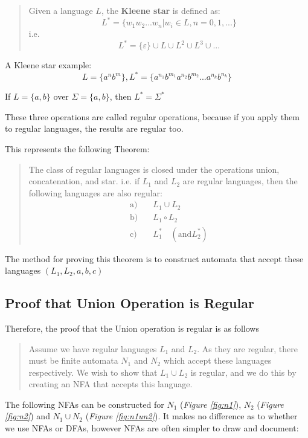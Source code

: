 \documentclass[11pt]{article}
\begin{document}
\begin{quote}
	Given a language $L$, the \textbf{Kleene star} is defined as:
	$$L^\ast=\{w_1w_2...w_n|w_i\in L, n = 0,1,...\}$$
	i.e.
	$$L^\ast=\{\varepsilon\} \cup L \cup L^2 \cup L^3 \cup ...$$
\end{quote}

A Kleene star example:
$$L = \{a^nb^m\}, L^\ast = \{a^{n_1}b^{m_1}a^{n_2}b^{m_2}...a^{n_k}b^{n_k}\}$$

If $L = \{a, b\}$ over $\Sigma = \{a, b\}$, then $L^\ast = \Sigma^\ast$

These three operations are called regular operations, because if you apply them
to regular languages, the results are regular too.

This represents the following Theorem:
\begin{quote}
	The class of regular languages is closed under the operations union,
	concatenation, and star. i.e. if $L_1$ and $L_2$ are regular languages, then
	the following languages are also regular:
	\begin{align*}
		\text{a)} & \quad L_1 \cup L_2                         \\
		\text{b)} & \quad L_1 \circ L_2                        \\
		\text{c)} & \quad L_1^\ast \quad (\text{and} L_2^\ast)
	\end{align*}
\end{quote}

The method for proving this theorem is to construct automata that accept these
languages $(L_1, L_2, a, b, c)$

\subsection{Proof that Union Operation is Regular}
Therefore, the proof that the Union operation is regular is as follows
\begin{quote}
	Assume we have regular languages $L_1$ and $L_2$. As they are regular, there
	must be finite automata $N_1$ and $N_2$ which accept these languages
	respectively. We wish to show that $L_1 \cup L_2$ is regular, and we do this
	by creating an NFA that accepts this language.
\end{quote}

The following NFAs can be constructed for $N_1$ (\emph{Figure \ref{fig:n1}}),
$N_2$ (\emph{Figure \ref{fig:n2}}) and $N_1 \cup N_2$ (\emph{Figure
	\ref{fig:n1un2}}). It makes no difference as to whether we use NFAs or DFAs,
however NFAs are often simpler to draw and document:
\end{document}
